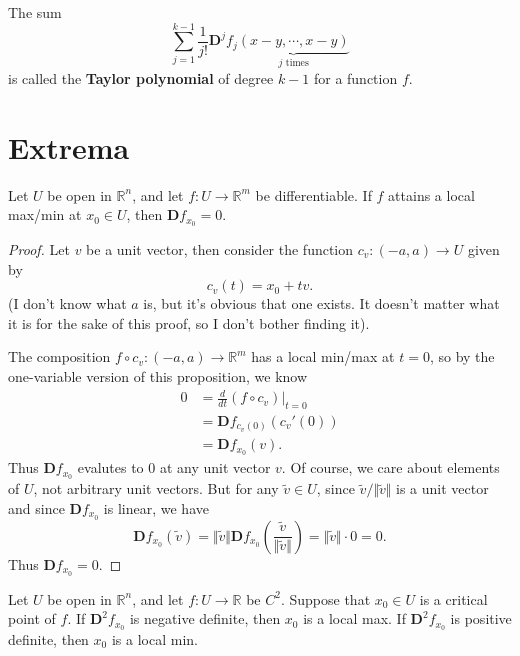 \documentclass[twoside,10pt]{report}
\begin{document}
\begin{defn}[]
The sum
\[
\sum_{j=1}^{k-1} \frac{1}{j!} \mathbf{D}^j f_j \underbrace{(x-y, \cdots, x-y)}_{j \text{ times}}
\] is called the \textbf{Taylor polynomial} of degree $k-1$ for a function $f$.
\end{defn}


\section{Extrema}

\begin{prop}
	Let $U$ be open in $\mathbb{R}^n$, and let $f: U \to \mathbb{R}^m$ be differentiable. If $f$ attains a local max/min at $x_0 \in U$, then $\mathbf{D}f_{x_0}=0$.
\end{prop}
\begin{proof}
	Let $v$ be a unit vector, then consider the function $c_v: (-a, a) \to U$ given by
	\[
		c_v(t) = x_0 + tv.
	\] (I don't know what $a$ is, but it's obvious that one exists. It doesn't matter what it is for the sake of this proof, so I don't bother finding it).

	The composition $f \circ c_v: (-a, a) \to \mathbb{R}^m$ has a local min/max at $t=0$, so by the one-variable version of this proposition, we know
	\begin{align*}
		0 &= \frac{d }{d t} (f \circ c_v) \Big|_{t=0} \\
		  &= \mathbf{D}f_{c_v(0)} (c_v'(0)) \\
		  &= \mathbf{D}f_{x_0} (v).
	\end{align*}
	Thus $\mathbf{D}f_{x_0}$ evalutes to 0 at any unit vector $v$. Of course, we care about elements of $U$, not arbitrary unit vectors. But for any $\tilde{v} \in U$, since $\tilde{v}/ \Vert{\tilde{v}}\Vert$ is a unit vector and since $\mathbf{D}f_{x_0}$ is linear, we have
	\[
		\mathbf{D}f_{x_0}(\tilde{v}) = \Vert{\tilde{v}}\Vert \mathbf{D}f_{x_0}\left( \frac{\tilde{v}}{\Vert{\tilde{v}}\Vert}  \right) = \Vert{\tilde{v}}\Vert \cdot 0 = 0.
	\] Thus $\mathbf{D}f_{x_0}=0.$
\end{proof}

\begin{thrm}{}{}
Let $U$ be open in $\mathbb{R}^n$, and let $f:U \to \mathbb{R}$ be $C^2$. Suppose that $x_0 \in U$ is a critical point of $f$. If $\mathbf{D}^2f_{x_0}$ is negative definite, then $x_0$ is a local max. If $\mathbf{D}^2f_{x_0}$ is positive definite, then $x_0$ is a local min.
\end{thrm}
\end{document}

